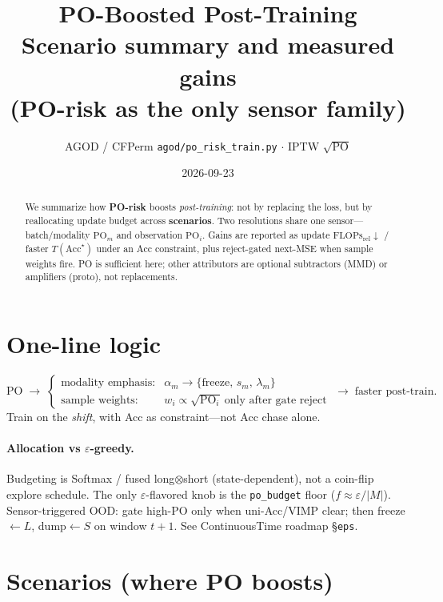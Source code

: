 \documentclass[11pt]{article}
\title{\textbf{PO-Boosted Post-Training}\\[0.35em]
\large Scenario summary and measured gains\\[0.1em]
\large (PO-risk as the only sensor family)}
\author{AGOD / CFPerm \quad \texttt{agod/po\_risk\_train.py} $\cdot$ IPTW $\sqrt{\mathrm{PO}}$}
\date{2026-09-23}
\newcommand{\PO}{\mathrm{PO}}
\newcommand{\Flops}{\mathrm{FLOPs}_{\mathrm{rel}}}
\newcommand{\Acc}{\mathrm{Acc}}
\begin{document}
\maketitle

\begin{abstract}
We summarize how \textbf{PO-risk} boosts \emph{post-training}:
not by replacing the loss, but by reallocating update budget across
\textbf{scenarios}.
Two resolutions share one sensor---batch/modality $\PO_m$ and
observation $\PO_i$.
Gains are reported as update $\Flops\downarrow$ / faster
$T(\Acc^\star)$ under an Acc constraint, plus reject-gated
next-MSE when sample weights fire.
PO is sufficient here; other attributors are optional subtractors
(MMD) or amplifiers (proto), not replacements.
\end{abstract}

\section{One-line logic}
\[
\PO
\;\longrightarrow\;
\begin{cases}
\text{modality emphasis:} &
  \alpha_m \to \{\mathrm{freeze},\,s_m,\,\lambda_m\}\\
\text{sample weights:} &
  w_i\propto\sqrt{\PO_i}\ \text{only after gate reject}
\end{cases}
\;\longrightarrow\;
\text{faster post-train}.
\]
Train on the \emph{shift}, with Acc as constraint---not Acc chase alone.

\paragraph{Allocation vs $\varepsilon$-greedy.}
Budgeting is Softmax / fused long$\otimes$short (state-dependent), not a
coin-flip explore schedule.
The only $\varepsilon$-flavored knob is the \texttt{po\_budget} floor
($f\approx\varepsilon/|M|$).
Sensor-triggered OOD: gate high-$\PO$ only when uni-Acc/VIMP clear;
then freeze$\leftarrow L$, dump$\leftarrow S$ on window $t{+}1$.
See ContinuousTime roadmap \S\texttt{eps}.

\section{Scenarios (where PO boosts)}
\label{sec:scen}
\end{document}
